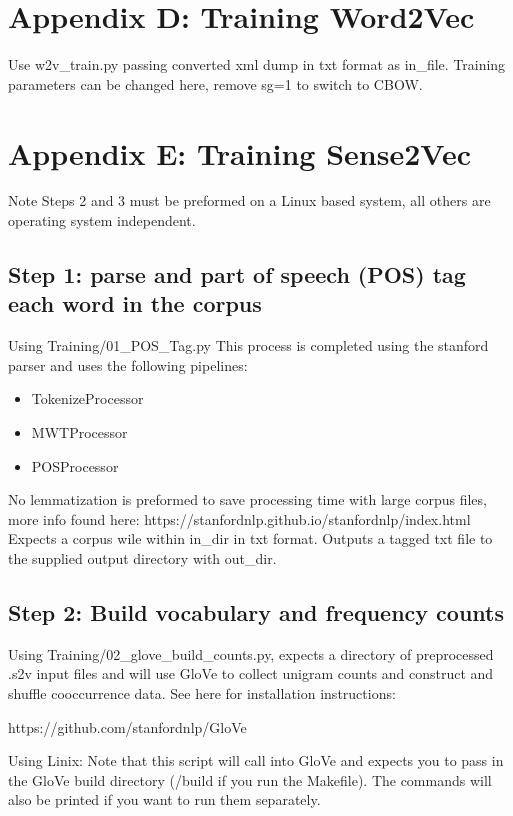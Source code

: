 \section*{Appendix D: Training Word2Vec}
Use w2v\_train.py passing converted xml dump in txt format as in\_file. Training parameters can be changed here, remove sg=1 to switch to CBOW.

\section*{Appendix E: Training Sense2Vec}
Note Steps 2 and 3 must be preformed on a Linux based system, all others are operating system independent.

\subsection*{Step 1: parse and part of speech (POS) tag each word in the corpus}
Using Training/01\_POS\_Tag.py This process is completed using the stanford parser and uses the following pipelines:

\begin{itemize}
    \item TokenizeProcessor
    \item MWTProcessor
    \item POSProcessor
\end{itemize}
\noindent
No lemmatization is preformed to save processing time with large corpus files, more info found here:
https://stanfordnlp.github.io/stanfordnlp/index.html 
Expects a corpus wile within in\_dir in txt format. Outputs a tagged txt file to the supplied output directory with out\_dir.

\subsection*{Step 2: Build vocabulary and frequency counts}
Using Training/02\_glove\_build\_counts.py, expects a directory of preprocessed .s2v input files and will use GloVe to collect unigram counts and construct and shuffle cooccurrence data. See here for installation instructions: 

\noindent
https://github.com/stanfordnlp/GloVe

\noindent
Using Linix:
Note that this script will call into GloVe and expects you to pass in the
GloVe build directory (/build if you run the Makefile). The commands will
also be printed if you want to run them separately.

